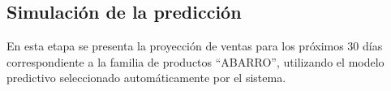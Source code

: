 








\subsection{Simulación de la predicción}
En esta etapa se presenta la proyección de ventas para los próximos 30 días correspondiente a la familia de productos “ABARRO”, utilizando el modelo predictivo seleccionado automáticamente por el sistema.

